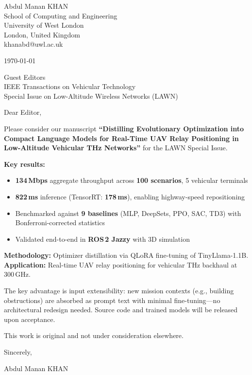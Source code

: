 \documentclass[11pt]{article}
\begin{document}
\begin{flushright}
Abdul Manan KHAN\\
School of Computing and Engineering\\
University of West London\\
London, United Kingdom\\
khanabd@uwl.ac.uk
\end{flushright}

\begin{center}
\today
\end{center}

\noindent
Guest Editors\\
IEEE Transactions on Vehicular Technology\\
Special Issue on Low-Altitude Wireless Networks (LAWN)

\bigskip
\noindent
Dear Editor,

\medskip
\noindent
Please consider our manuscript \textbf{``Distilling Evolutionary Optimization into Compact Language Models for Real-Time UAV Relay Positioning in Low-Altitude Vehicular THz Networks''} for the LAWN Special Issue.

\medskip
\noindent
\textbf{Key results:}
\begin{itemize}
    \item \textbf{134\,Mbps} aggregate throughput across \textbf{100 scenarios}, 5 vehicular terminals
    \item \textbf{822\,ms} inference (TensorRT: \textbf{178\,ms}), enabling highway-speed repositioning
    \item Benchmarked against \textbf{9 baselines} (MLP, DeepSets, PPO, SAC, TD3) with Bonferroni-corrected statistics
    \item Validated end-to-end in \textbf{ROS\,2 Jazzy} with 3D simulation
\end{itemize}

\noindent
\textbf{Methodology:} Optimizer distillation via QLoRA fine-tuning of TinyLlama-1.1B.\\
\textbf{Application:} Real-time UAV relay positioning for vehicular THz backhaul at 300\,GHz.

\medskip
\noindent
The key advantage is input extensibility: new mission contexts (e.g., building obstructions) are absorbed as prompt text with minimal fine-tuning---no architectural redesign needed. Source code and trained models will be released upon acceptance.

\medskip
\noindent
This work is original and not under consideration elsewhere.

\bigskip
\begin{flushright}
Sincerely,

\medskip
Abdul Manan KHAN
\end{flushright}
\end{document}
